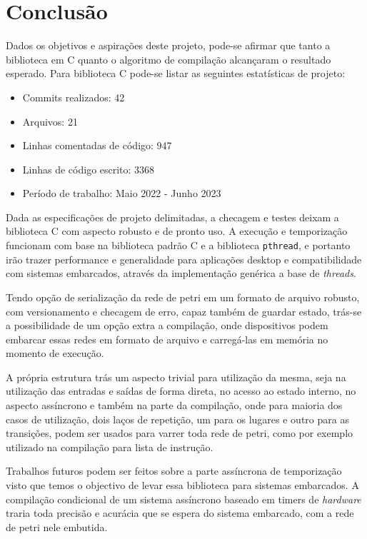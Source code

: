 \chapter{Conclusão}

Dados os objetivos e aspirações deste projeto, pode-se afirmar que tanto a biblioteca em C quanto o algoritmo de compilação alcançaram o resultado esperado. Para biblioteca C \cite{github-pnet} pode-se listar as seguintes estatísticas de projeto:

\begin{itemize}
	\item Commits realizados: 42
 	\item Arquivos: 21
 	\item Linhas comentadas de código: 947
 	\item Linhas de código escrito: 3368
	\item Período de trabalho: Maio 2022 - Junho 2023
\end{itemize}

Dada as especificações de projeto delimitadas, a checagem e testes deixam a biblioteca C com aspecto robusto e de pronto uso. A execução e temporização funcionam com base na biblioteca padrão C e a biblioteca \lstinline{pthread}, e portanto irão trazer performance e generalidade para aplicações desktop e compatibilidade com sistemas embarcados, através da implementação genérica a base de \textit{threads}.

Tendo opção de serialização da rede de petri em um formato de arquivo robusto, com versionamento e checagem de erro, capaz também de guardar estado, trás-se a possibilidade de um opção extra a compilação, onde dispositivos podem embarcar essas redes em formato de arquivo e carregá-las em memória no momento de execução.

A própria estrutura trás um aspecto trivial para utilização da mesma, seja na utilização das entradas e saídas de forma direta, no acesso ao estado interno, no aspecto assíncrono e também na parte da compilação, onde para maioria dos casos de utilização, dois laços de repetição, um para os lugares e outro para as transições, podem ser usados para varrer toda rede de petri, como por exemplo utilizado na compilação para lista de instrução.

Trabalhos futuros podem ser feitos sobre a parte assíncrona de temporização visto que temos o objectivo de levar essa biblioteca para sistemas embarcados. A compilação condicional de um sistema assíncrono baseado em timers de \textit{hardware} traria toda precisão e acurácia que se espera do sistema embarcado, com a rede de petri nele embutida.

